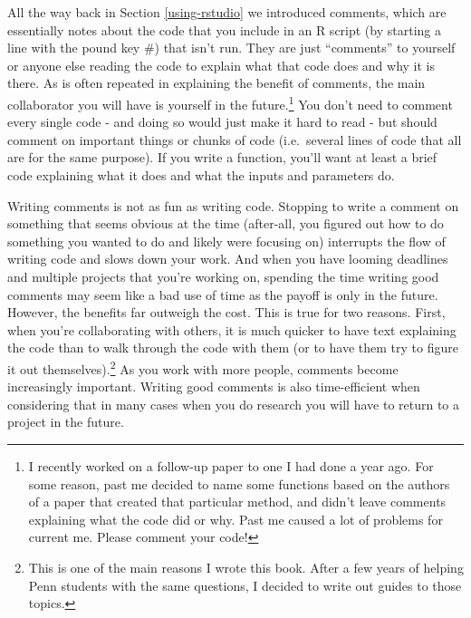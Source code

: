 \documentclass[
  12pt,
  openany]{book}
\begin{document}
All the way back in Section \ref{using-rstudio} we introduced comments, which are essentially notes about the code that you include in an R script (by starting a line with the pound key \#) that isn't run. They are just ``comments'' to yourself or anyone else reading the code to explain what that code does and why it is there. As is often repeated in explaining the benefit of comments, the main collaborator you will have is yourself in the future.\footnote{I recently worked on a follow-up paper to one I had done a year ago. For some reason, past me decided to name some functions based on the authors of a paper that created that particular method, and didn't leave comments explaining what the code did or why. Past me caused a lot of problems for current me. Please comment your code!} You don't need to comment every single code - and doing so would just make it hard to read - but should comment on important things or chunks of code (i.e.~several lines of code that all are for the same purpose). If you write a function, you'll want at least a brief code explaining what it does and what the inputs and parameters do.

Writing comments is not as fun as writing code. Stopping to write a comment on something that seems obvious at the time (after-all, you figured out how to do something you wanted to do and likely were focusing on) interrupts the flow of writing code and slows down your work. And when you have looming deadlines and multiple projects that you're working on, spending the time writing good comments may seem like a bad use of time as the payoff is only in the future. However, the benefits far outweigh the cost. This is true for two reasons. First, when you're collaborating with others, it is much quicker to have text explaining the code than to walk through the code with them (or to have them try to figure it out themselves).\footnote{This is one of the main reasons I wrote this book. After a few years of helping Penn students with the same questions, I decided to write out guides to those topics.} As you work with more people, comments become increasingly important. Writing good comments is also time-efficient when considering that in many cases when you do research you will have to return to a project in the future.
\end{document}
